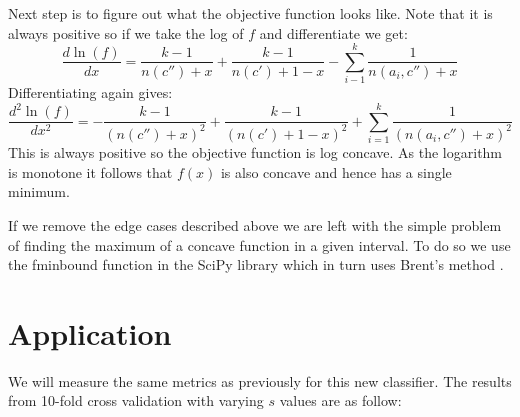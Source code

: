 Next step is to figure out what the objective function looks like.
Note that it is always positive so if we take the log of $f$ and differentiate we get:
\begin{equation}
	\frac{d\ln(f)}{dx} = \frac{k-1}{n(c'')+x} + \frac{k-1}{n(c')+1-x} - \sum_{i-1}^k \frac{1}{n(a_i, c'') + x}
\end{equation}
Differentiating again gives:
\begin{equation}
	\frac{d^2\ln(f)}{dx^2} = -\frac{k-1}{(n(c'') + x)^2} + \frac{k-1}{(n(c')+1-x)^2} + \sum_{i=1}^k \frac{1}{(n(a_i, c'') + x)^2}
\end{equation}
This is always positive so the objective function is log concave.
As the logarithm is monotone it follows that $f(x)$ is also concave and hence has a single minimum.

If we remove the edge cases described above we are left with the simple problem of finding the maximum of a concave function in a given interval.
To do so we use the fminbound function in the SciPy library which in turn uses Brent's method \cite{fminbound}.

\section{Application}

We will measure the same metrics as previously for this new classifier.
The results from 10-fold cross validation with varying $s$ values are as follow:


